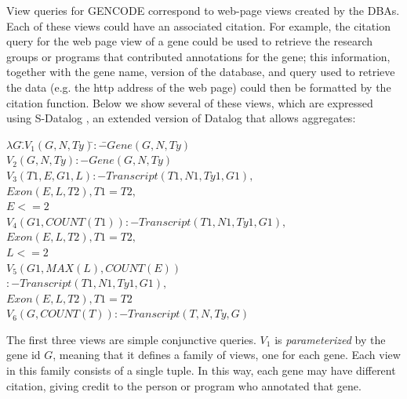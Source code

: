 View queries for GENCODE correspond to web-page views  created by the DBAs.  Each of these views could have an associated citation.  For example, the citation query for the web page view of a gene could be used to retrieve the research groups or programs that contributed annotations for the gene; this information, together with the gene name, version of the database, and query used to retrieve the data (e.g. the http address of the web page) could then be formatted by the citation function.
Below we show several of these views, which are expressed using S-Datalog \cite{consens1990low}, an extended version of Datalog that allows aggregates:
\noindent
\begin{tabbing}
$\lambda G.$\=$V_1(G, N, Ty) $\hspace{4em}\=$:-$\=$ Gene(G, N, Ty)$\\
\> $V_2(G, N, Ty) $\>$:-$\>$ Gene(G, N, Ty)$\\
\> $V_3(T1, E, G1, L)$\>$:-$\>$Transcript(T1, N1, Ty1, G1),$\\
\>\>\>$Exon(E, L, T2), T1 = T2,$\\
\>\>\>$E <= 2$\\
\> $V_4(G1, COUNT(T1))$\>$:-$\>$Transcript(T1, N1, Ty1, G1),$\\
\>\>\>$Exon(E, L, T2), T1 = T2, $\\
\>\>\>$L <= 2$\\
\>$V_5(G1, MAX(L), COUNT(E))$\\
\>\>$:-$\>$Transcript(T1, N1, Ty1, G1),$\\
\>\>\>$Exon(E, L, T2), T1 = T2$\\
\> $V_6(G, COUNT(T)) $\>$:-$\>$ Transcript(T, N, Ty, G)$
\end{tabbing}
The first three views are simple conjunctive queries. %
$V_1$ is \textit{parameterized} by the gene id $G$, meaning that it defines a family of views, one for each gene. Each view in this family consists of a single tuple.  In this way, each gene may have different citation, giving credit to the person or program who annotated that gene. 
